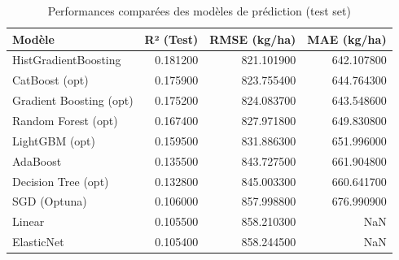 \begin{table}
\caption{Performances comparées des modèles de prédiction (test set)}
\label{tab:performances}
\begin{tabular}{lrrr}
\toprule
Modèle & R² (Test) & RMSE (kg/ha) & MAE (kg/ha) \\
\midrule
HistGradientBoosting & 0.181200 & 821.101900 & 642.107800 \\
CatBoost (opt) & 0.175900 & 823.755400 & 644.764300 \\
Gradient Boosting (opt) & 0.175200 & 824.083700 & 643.548600 \\
Random Forest (opt) & 0.167400 & 827.971800 & 649.830800 \\
LightGBM (opt) & 0.159500 & 831.886300 & 651.996000 \\
AdaBoost & 0.135500 & 843.727500 & 661.904800 \\
Decision Tree (opt) & 0.132800 & 845.003300 & 660.641700 \\
SGD (Optuna) & 0.106000 & 857.998800 & 676.990900 \\
Linear & 0.105500 & 858.210300 & NaN \\
ElasticNet & 0.105400 & 858.244500 & NaN \\
\bottomrule
\end{tabular}
\end{table}
